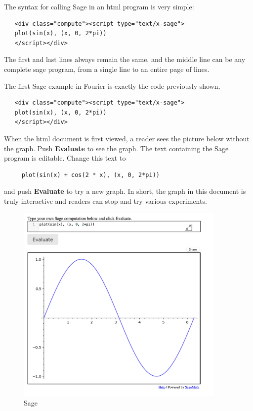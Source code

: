 \documentclass[11pt, oneside]{article}   	%
\begin{document}
The syntax for calling Sage in an html program is very simple:
\begin{verbatim}
   <div class="compute"><script type="text/x-sage">
   plot(sin(x), (x, 0, 2*pi))
   </script></div>
\end{verbatim}

The first and last lines always remain the same, and the middle line can be any complete sage
program, from a single line to an entire page of lines.


\newpage


The first Sage example in Fourier is exactly the code previously shown,
\begin{verbatim}
   <div class="compute"><script type="text/x-sage">
   plot(sin(x), (x, 0, 2*pi))
   </script></div>
\end{verbatim}



When the html document is first viewed, a reader
sees the picture below without the graph. Push {\bf Evaluate} to see the graph. 
The text containing the Sage program is editable. Change this text to
\begin{verbatim}
     plot(sin(x) + cos(2 * x), (x, 0, 2*pi))
 \end{verbatim} 
 and push {\bf Evaluate}  to try a new graph.
In short, the graph in this document is truly interactive and readers can stop and try various experiments.

  \begin{figure}[htbp] %
     \centering
     \includegraphics[width=4in]{image1.png} 
     \caption{Sage}
     \label{fig:example}
  \end{figure}
  \newpage
  
\end{document}

